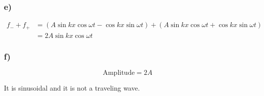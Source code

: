\documentclass[../homework.tex]{subfiles}
\begin{document}
\subsubsection*{e)}
\begin{align*}
    f_- + f_+ &= (A \sin kx \cos \omega t - \cos kx \sin \omega t) + (A \sin kx \cos \omega t + \cos kx \sin \omega t) \\
    &= 2A \sin kx \cos \omega t
\end{align*}

\subsubsection*{f)}
\begin{equation*}
    \text{Amplitude} = 2A
\end{equation*}

It is sinusoidal and it is not a traveling wave.
\end{document}

